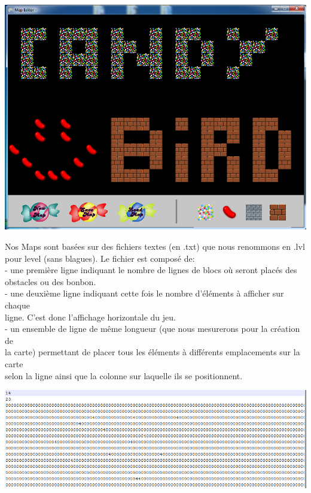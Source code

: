 \documentclass [11pt]{report}
\begin{document}
			\begin{center}
			\includegraphics[scale = 0.4]{images/EditeurMap.png}
			\end{center}
			
			
			
		\newpage
			
			
			
			Nos Maps sont basées sur des fichiers textes (en .txt) que nous renommons en .lvl pour level (sans blagues). Le fichier est composé de:\\
						
						\indent- une première ligne indiquant le nombre de lignes de blocs où seront placés des \\\indent obstacles ou des bonbon.\\
						
						\indent- une deuxième ligne indiquant cette fois le nombre d'éléments à afficher sur chaque\\\indent ligne. C'est donc l'affichage horizontale du jeu.\\
						
						\indent- un ensemble de ligne de même longueur (que nous mesurerons pour la création de \\\indent la carte) permettant de placer tous les éléments à différents emplacements sur la carte\\\indent selon la ligne ainsi que la colonne sur laquelle ils se positionnent.
						
						
						\vspace{10mm}
						
						\begin{center}
							\includegraphics[scale = 0.6]{images/lvl.png}
						\end{center}
						
\end{document}
